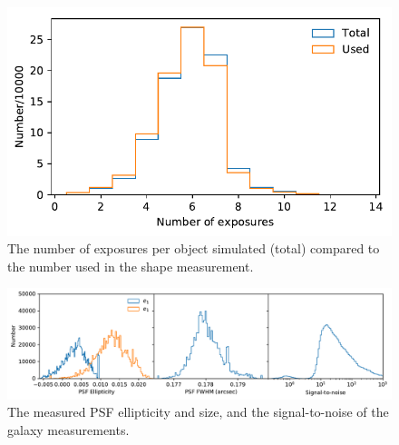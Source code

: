 \documentclass[aps,prd, amsmath,amssymb,superscriptaddress,showkeys,nofootinbib,reprint,preprintnumbers]{revtex4-1}
\begin{document}
\begin{figure}
\begin{center}
\includegraphics[width=\columnwidth]{figures/hist2.pdf}
\end{center}
\caption[]{
The number of exposures per object simulated (total) compared to the number used in the shape measurement.
\label{fig:hist2}}
\end{figure}

\begin{figure}
\begin{center}
\includegraphics[width=\textwidth]{figures/hist3.pdf}
\end{center}
\caption[]{
The measured PSF ellipticity and size, and the signal-to-noise of the galaxy measurements.
\label{fig:hist3}}
\end{figure}
\end{document}
